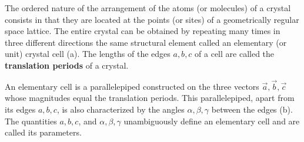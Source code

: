 The ordered nature of the arrangement of the atoms (or molecules) of a crystal consists in that they are located at the points (or sites) of a geometrically regular space lattice. The entire crystal can be obtained by repeating many times in three different directions the same structural element called an elementary (or unit) crystal cell (a). The lengths of the edges $a, b, c$ of a cell are called the \textbf{translation periods} of a crystal.

An elementary cell is a parallelepiped constructed on the three vectors $\vec{a}, \vec{b}, \vec{c}$ whose magnitudes equal the translation periods. This parallelepiped, apart from its edges $a, b, c$, is also characterized by the angles $\alpha, \beta, \gamma$ between the edges (b). The quantities $a, b, c$, and $\alpha, \beta, \gamma$ unambiguously define an elementary cell and are called its parameters.

